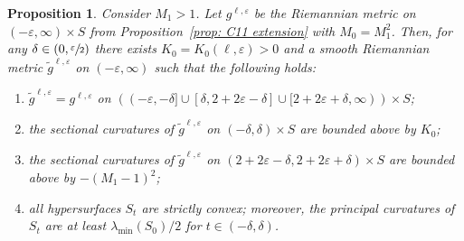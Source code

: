 \documentclass[JEP,XML,SOM,Unicode,NoFloatCountersInSection]{cedram}
\newenvironment{enumeratea}
{\bgroup\def\theenumi{\alph{enumi}}\begin{enumerate}}
{\end{enumerate}\egroup}
\newtheorem{proposition}[theorem]{Proposition}
\theoremstyle{definition}
\let\eps\varepsilon
\renewcommand{\>}{{\rangle}}
\newcommand{\<}{{\langle}}
\begin{document}
\begin{proposition}\label{prop: smoothify}
Consider $M_1>1$. Let $g^{\ell,\eps}$ be the Riemannian metric on $(-\eps,\infty)\times S$ from Proposition~\ref{prop: C11 extension} with $M_0=M^2_1$. Then, for any $\delta\in(0,\sfrac{\eps}{2})$ there exists $K_0=K_0(\ell, \eps)>0$ and a smooth Riemannian metric $\tilde g^{\ell,\eps}$ on $(-\eps,\infty)$ such that the following holds:
\begin{enumeratea}
\item\label{prop: smoothifya} $\tilde g^{\ell,\eps}= g^{\ell,\eps}$ on $\left((-\eps,-\delta]\cup [\delta,2+2\eps-\delta]\cup [2+2\eps+\delta,\infty)\right)\times S$;
\item\label{prop: smoothifyb} the sectional curvatures of $\tilde{g}^{\ell,\eps}$ on $(-\delta,\delta)\times S$ are bounded above by $K_0$;
\item\label{prop: smoothifyc} the sectional curvatures of $\tilde{g}^{\ell,\eps}$ on $(2+2\eps-\delta,2+2\eps+\delta)\times S$ are bounded above by $-(M_1-1)^2$;
\item\label{prop: smoothifyd} all hypersurfaces $S_t$ are strictly convex; moreover, the principal curvatures of~$S_t$ are at least $\lambda_{\min}(S_0)/2$ for $t\in(-\delta, \delta)$.
\end{enumeratea}
\end{proposition}
\end{document}
